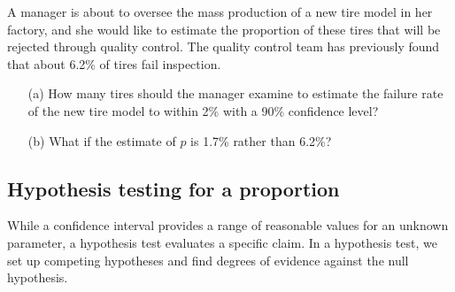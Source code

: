 \begin{exercisewrap}
\begin{nexercise}
A manager is about to oversee the mass production of a new tire model in her factory, and she would like to estimate the proportion of these tires that will be rejected through quality control. The quality control team has previously found that about 6.2\% of tires fail inspection.
\begin{itemize}
\setlength{\itemsep}{0mm}
\item[(a)] How many tires should the manager examine to estimate the failure rate of the new tire model to within 2\% with a 90\% confidence level?\footnotemark
\item[(b)] What if the estimate of $p$ is 1.7\% rather than 6.2\%?\footnotemark
 
\end{itemize}
\end{nexercise}
\end{exercisewrap}



\subsection{Hypothesis testing for a proportion}
\label{htForPropSection}

While a confidence interval provides a range of reasonable values for an unknown parameter, a hypothesis test evaluates a specific claim. In a hypothesis test, we set up competing hypotheses and find degrees of evidence against the null hypothesis.

